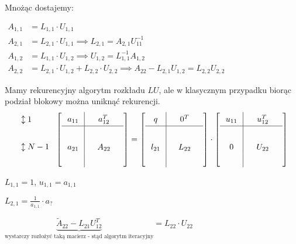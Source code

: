 \documentclass[hidelinks,a4paper,fleqn,oneside]{book}
\begin{document}
Mnożąc dostajemy:

$
\begin{array}{ll}
	A_{1,1} & = L_{1,1} \cdot U_{1,1}                                                                           \\
	A_{2,1} & = L_{2,1} \cdot U_{1,1} \implies L_{2,1} = A_{2,1}U_{11}^{-1}                                     \\
	A_{1,2} & = L_{1,1} \cdot U_{1,2}  \implies U_{1,2} = L^{-1}_{1,1} A_{1,2}                                  \\
	A_{2,2} & = L_{2,1} \cdot U_{1,2} + L_{2,2} \cdot U_{2,2} \implies A_{22} - L_{2,1}U_{1,2} = L_{2,2}U_{2,2} 
\end{array}
$

Mamy rekurencyjny algorytm rozkładu $LU$, ale w klasycznym przypadku biorąc podział blokowy można uniknąć rekurencji. 
\[\arraycolsep=0.7em\def\arraystretch{1.4}
	\begin{array}{l}
		\updownarrow 1   \\ \\
		\updownarrow N-1 \\ \ 
	\end{array}
	\left[
		\begin{array}{c|c}
			a_{11} & \quad a_{12}^T \quad \\ \hline & \\
			a_{21} & A_{22}               \\ &
		\end{array}
	\right] =
	\left[
		\begin{array}{c|c}
			q      & \quad 0^T \quad \\ \hline & \\
			l_{21} & L_{22}          \\ &
		\end{array}
	\right]
	\cdot 
	\left[
		\begin{array}{c|c}
			u_{11} & \quad u_{12}^T \quad \\ \hline & \\
			0      & U_{22}               \\ &
		\end{array}
	\right]
\]

$L_{1,1} = 1$, $u_{1,1} = a_{1,1}$

$L_{2,1} = \frac{1}{a_{1,1}} \cdot a_{?}$

$\underbrace{\tilde{A}_{22} - L_{21}U_{12}^T}_{\textrm{wystarczy rozłożyć taką macierz - stąd algorytm iteracyjny}} = L_{22} \cdot U_{22}$
\end{document}
